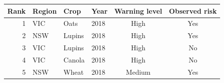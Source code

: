 \begin{tabular}{@{}rlllcc@{}}
\toprule
Rank & Region & Crop & Year & Warning level & Observed risk \\
\midrule
1 & VIC & Oats & 2018 & High & Yes \\
2 & NSW & Lupins & 2018 & High & Yes \\
3 & VIC & Lupins & 2018 & High & No \\
4 & VIC & Canola & 2018 & High & No \\
5 & NSW & Wheat & 2018 & Medium & Yes \\
\bottomrule
\end{tabular}
